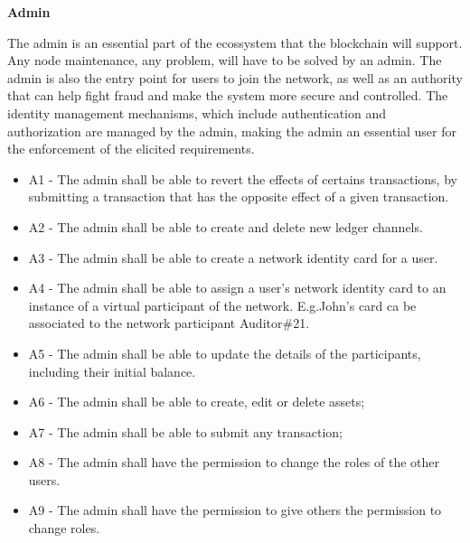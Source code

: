 		\par \textbf{Admin}
		
		The admin is an essential part of the ecossystem that the blockchain will support. Any node maintenance, any problem, will have to be solved by an admin. The admin is also the entry point for users to join the network, as well as an authority that can help fight fraud and make the system more secure and controlled. The identity management mechanisms, which include authentication and authorization are managed by the admin, making the admin an essential user for the enforcement of the elicited requirements.
		
		\begin{itemize}
			\item A1 - The admin shall be able to revert the effects of certains transactions, by submitting a transaction that has the opposite effect of a given transaction. %
			\item A2 - The admin shall be able to create and delete new ledger channels.
			\item A3 - The admin shall be able to create a network identity card for a user.
			\item A4 - The admin shall be able to assign a user's network identity card to an instance of a virtual participant of the network. E.g.John's card ca be associated to the network participant Auditor\#21.
			\item A5 - The admin shall be able to update the details of the participants, including their initial balance.
			\item A6 - The admin shall be able to create, edit or delete assets;
			\item A7 - The admin shall be able to submit any transaction;
			\item A8 - The admin shall have the permission to change the roles of the other users.
			\item A9 - The admin shall have the permission to give others the permission to change roles.
		\end{itemize}

